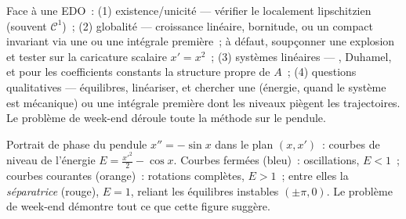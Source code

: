 \begin{method}\label{met:b3:ode:strategy}
Face à une EDO~: (1) existence/unicité --- vérifier le
 localement lipschitzien (souvent $\mathcal C^1$)~;
(2) globalité --- croissance linéaire, bornitude, ou un
compact invariant via une  ou une
intégrale première~; à défaut, soupçonner une explosion et
tester sur la caricature scalaire $x' = x^2$~; (3) systèmes
linéaires --- , Duhamel, et pour les coefficients
constants la structure propre de $A$~; (4) questions
qualitatives --- équilibres, linéariser, et chercher une
 (énergie, quand le système est
mécanique) ou une intégrale première dont les niveaux
piègent les trajectoires. Le problème de week-end déroule
toute la méthode sur le pendule.
\end{method}

\begin{omfigure}

{\small Portrait de phase du pendule $x'' = -\sin x$ dans le
plan $(x, x')$~: courbes de niveau de l'énergie $E =
\frac{x'^2}2 - \cos x$. Courbes fermées (bleu)~: oscillations,
$E < 1$~; courbes courantes (orange)~: rotations complètes,
$E > 1$~; entre elles la \emph{séparatrice} (rouge), $E = 1$,
reliant les équilibres instables $(\pm\pi, 0)$. Le problème de
week-end démontre tout ce que cette figure suggère.}
\end{omfigure}

